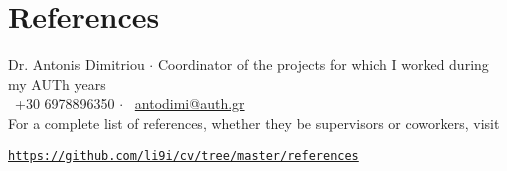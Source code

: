 \documentclass[a4paper,10pt,twoside]{article}
\begin{document}
\section{References}
\noindent Dr. Antonis Dimitriou $\cdot$ Coordinator of the projects for which I worked during my AUTh years \\
\faPhone \ +30 6978896350 $\cdot$ \faEnvelopeO \ \href{mailto:antodimi@auth.gr}{antodimi@auth.gr} \\

\noindent For a complete list of references, whether they be supervisors or coworkers, visit
\begin{center}\noindent
\href{https://github.com/li9i/cv/tree/master/references}{\texttt{https://github.com/li9i/cv/tree/master/references}}
\end{center}

\vspace*{\fill}
\end{document}
